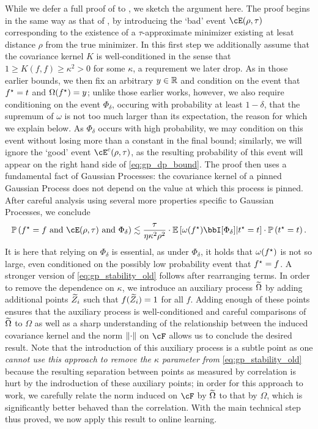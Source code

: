 While we defer a full proof of  to , we sketch the argument here.  The proof begins in the same way as that of \citet{block2022smoothed,block2024oracle}, by introducing the `bad' event $\cE(\rho, \tau)$ corresponding to the existence of a $\tau$-approximate minimizer existing at lesat distance $\rho$ from the true minimizer.  In this first step we additionally assume that the covariance kernel $K$ is well-conditioned in the sense that $1 \geq K(f,f) \geq \kappa^2 > 0$ for some $\kappa$, a requrement we later drop.  As in those earlier bounds, we then fix an arbitrary $y \in \mathbb{R}$ and condition on the event that $f^\star = t$ and $\Omega(f^\star) = y$; unlike those earlier works, however, we also require conditioning on the event $\Phi_\delta$, occuring with probability at least $1 - \delta$, that the supremum of $\omega$ is not too much larger than its expectation, the reason for which we explain below.  As $\Phi_\delta$ occurs with high probability, we may condition on this event without losing more than a constant in the final bound; similarly, we will ignore the `good' event $\cE^c(\rho, \tau)$, as the resulting probability of this event will appear on the right hand side of \eqref{eq:gp_dp_bound}.  The proof then uses a fundamental fact of Gaussian Processes: the covariance kernel of a pinned Gaussian Process does not depend on the value at which this process is pinned.  After careful analysis using several more properties specific to Gaussian Processes, we conclude
\begin{align}
    \pp\left( \fstar = f \text{ and } \cE(\rho, \tau) \text{ and } \Phi_\delta \right) \lesssim \frac{\tau}{\eta \kappa^2 \rho^2} \cdot \ee\left[ \omega(\fstar) \bbI[\Phi_\delta] | \tstar = t \right] \cdot \pp\left( \tstar = t \right).
\end{align}
It is here that relying on $\Phi_\delta$ is essential, as under $\Phi_\delta$, it holds that $\omega(f^\star)$ is not so large, even conditioned on the possibly low probability event that $f^\star = f$.  A stronger version of \eqref{eq:gp_stability_old} follows after rearranging terms.  In order to remove the dependence on $\kappa$, we introduce an auxiliary process $\widetilde{\Omega}$ by adding additional points $\widetilde{Z}_i$ such that $f(\widetilde{Z}_i) = 1$ for all $f$.  Adding enough of these points ensures that the auxiliary process is well-conditioned and careful comparisons of $\widetilde{\Omega}$ to $\Omega$ as well as a sharp understanding of the relationship between the induced covariance kernel and the norm $\left\|\cdot\right\|$ on $\cF$ allows us to conclude the desired result.  Note that the introduction of this auxiliary process is a subtle point as one \emph{cannot use this approach to remove the $\kappa$ parameter from } \eqref{eq:gp_stability_old} because the resulting separation between points as measured by correlation is hurt by the indroduction of these auxiliary points; in order for this approach to work, we carefully relate the norm induced on $\cF$ by $\widetilde{\Omega}$ to that by $\Omega$, which is significantly better behaved than the correlation.  With the main technical step thus proved, we now apply this result to online learning.  








